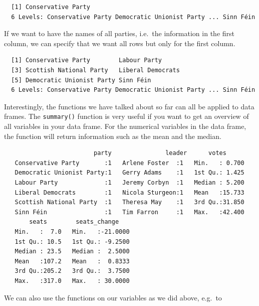 \documentclass[12pt,oneside]{reedthesis}
\theoremstyle{definition}
\theoremstyle{definition}
\theoremstyle{definition}
\theoremstyle{remark}
\begin{document}
  \begin{verbatim}
  [1] Conservative Party
  6 Levels: Conservative Party Democratic Unionist Party ... Sinn Féin
  \end{verbatim}
  If we want to have the names of all parties, i.e.~the information in the
  first column, we can specify that we want all rows but only for the
  first column.
  \begin{Shaded}
  \begin{Highlighting}[]
  \NormalTok{uk2017[, }\NormalTok{] }
  \end{Highlighting}
  \end{Shaded}
  \begin{verbatim}
  [1] Conservative Party        Labour Party             
  [3] Scottish National Party   Liberal Democrats        
  [5] Democratic Unionist Party Sinn Féin                
  6 Levels: Conservative Party Democratic Unionist Party ... Sinn Féin
  \end{verbatim}
  Interestingly, the functions we have talked about so far can all be
  applied to data frames. The \texttt{summary()} function is very useful
  if you want to get an overview of all variables in your data frame. For
  the numerical variables in the data frame, the function will return
  information such as the mean and the median.
  \begin{Shaded}
  \begin{Highlighting}[]
  \end{Highlighting}
  \end{Shaded}
  \begin{verbatim}
                         party               leader      votes       
   Conservative Party       :1   Arlene Foster  :1   Min.   : 0.700  
   Democratic Unionist Party:1   Gerry Adams    :1   1st Qu.: 1.425  
   Labour Party             :1   Jeremy Corbyn  :1   Median : 5.200  
   Liberal Democrats        :1   Nicola Sturgeon:1   Mean   :15.733  
   Scottish National Party  :1   Theresa May    :1   3rd Qu.:31.850  
   Sinn Féin                :1   Tim Farron     :1   Max.   :42.400  
       seats        seats_change     
   Min.   :  7.0   Min.   :-21.0000  
   1st Qu.: 10.5   1st Qu.: -9.2500  
   Median : 23.5   Median :  2.5000  
   Mean   :107.2   Mean   :  0.8333  
   3rd Qu.:205.2   3rd Qu.:  3.7500  
   Max.   :317.0   Max.   : 30.0000  
  \end{verbatim}
  We can also use the functions on our variables as we did above, e.g.~to
\end{document}
